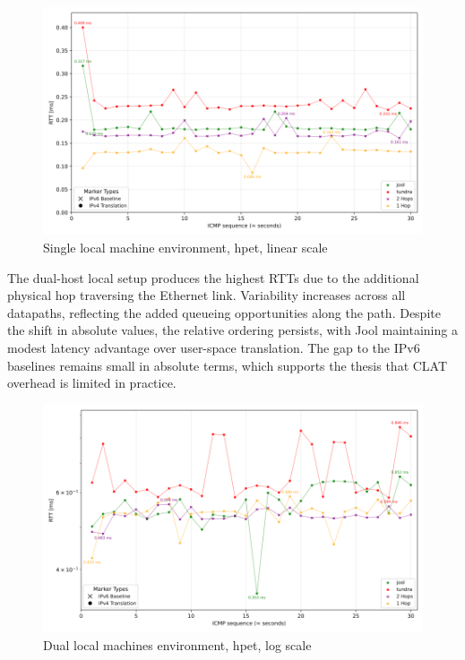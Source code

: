 \begin{figure}[H]
    \centering
    \includegraphics[width=1\textwidth]{resources/plots/CombinedPlot/RTT/Single_ping_rtt_Ping_30s_linear.png}
    \caption{Single local machine environment, hpet, linear scale}
    \label{fig:Local_icmp_sameScale_hpet_linear}
\end{figure}

The dual-host local setup produces the highest RTTs due to the additional physical hop traversing the Ethernet link. Variability increases across all datapaths, reflecting the added queueing opportunities along the path. Despite the shift in absolute values, the relative ordering persists, with Jool maintaining a modest latency advantage over user-space translation. The gap to the IPv6 baselines remains small in absolute terms, which supports the thesis that CLAT overhead is limited in practice. 


\begin{figure}[H]
    \centering
    \includegraphics[width=1\textwidth]{resources/plots/CombinedPlot/RTT/Double_ping_rtt_Ping_30s_log.png}
    \caption{Dual local machines environment, hpet, log scale}
    \label{fig:Dual_icmp_sameScale_hpet_log}
\end{figure}

